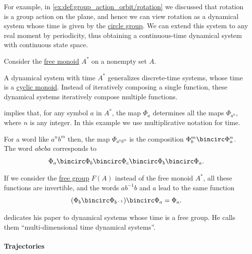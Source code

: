 \begin{example}
\begin{thmenum}
    For example, in \cref{ex:def:group_action_orbit/rotation} we discussed that rotation is a group action on the plane, and hence we can view rotation as a dynamical system whose time is given by the \hyperref[def:circle_group]{circle group}. We can extend this system to any real moment by periodicity, thus obtaining a continuous-time dynamical system with continuous state space.

     Consider the \hyperref[def:free_monoid]{free monoid} \( A^* \) on a nonempty set \( A \).

    A dynamical system with time \( A^* \) generalizes discrete-time systems, whose time is a \hyperref[def:cyclic_monoid]{cyclic monoid}. Instead of iteratively composing a single function, these dynamical systems iteratively compose multiple functions.

     implies that, for any symbol \( a \) in \( A^* \), the map \( \Phi_a \) determines all the maps \( \Phi_{a^n} \), where \( n \) is any integer. In this example we use multiplicative notation for time.

    For a word like \( a^n b^m \) then, the map \( \Phi_{a^n b^m} \) is the composition \( \Phi_b^m \bincirc \Phi_a^n \). The word \( abcba \) corresponds to
    \begin{equation*}
      \Phi_a \bincirc \Phi_b \bincirc \Phi_c \bincirc \Phi_b \bincirc \Phi_a.
    \end{equation*}

    If we consider the \hyperref[def:free_group]{free group} \( F(A) \) instead of the free monoid \( A^* \), all these functions are invertible, and the words \( ab^{-1}b \) and \( a \) lead to the same function
    \begin{equation*}
      (\Phi_b \bincirc \Phi_{b^{-1}}) \bincirc \Phi_a = \Phi_a.
    \end{equation*}

    \textcite[363]{Rozikov2012MultiDimensionalTimeDynamicalSystem} dedicates his paper to dynamical systems whose time is a free group. He calls them \enquote{multi-dimensional time dynamical systems}.
  \end{thmenum}
\end{example}

\paragraph{Trajectories}

